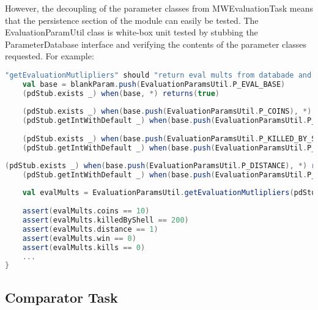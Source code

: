 However, the decoupling of the parameter classes from MWEvaluationTask means that the persistence section of the module can easily be tested. The EvaluationParamUtil class is white-box unit tested by stubbing the ParameterDatabase interface and verifying the contents of the parameter classes requested. For example:

\begin{minipage}{0.9\linewidth}
\centering
\begin{lstlisting}[language=scala]
"getEvaluationMutlipliers" should "return eval mults from databade and zero otherwise" in {
    val base = blankParam.push(EvaluationParamsUtil.P_EVAL_BASE)
    (pdStub.exists _) when(base, *) returns(true)
  
    (pdStub.exists _) when(base.push(EvaluationParamsUtil.P_COINS), *) returns(true)
    (pdStub.getIntWithDefault _) when(base.push(EvaluationParamsUtil.P_COINS), *, *) returns(10)
     
    (pdStub.exists _) when(base.push(EvaluationParamsUtil.P_KILLED_BY_SHELL), *) returns(true)
    (pdStub.getIntWithDefault _) when(base.push(EvaluationParamsUtil.P_KILLED_BY_SHELL), *, *) returns(200)
\end{lstlisting}
\end{minipage}     
    
\begin{minipage}{0.9\linewidth}
\centering
\begin{lstlisting}[language=scala]       
    (pdStub.exists _) when(base.push(EvaluationParamsUtil.P_DISTANCE), *) returns(true)
    (pdStub.getIntWithDefault _) when(base.push(EvaluationParamsUtil.P_DISTANCE), *, *) returns(1)
    
    val evalMults = EvaluationParamsUtil.getEvaluationMutlipliers(pdStub, base);
    
    assert(evalMults.coins == 10)
    assert(evalMults.killedByShell == 200)
    assert(evalMults.distance == 1)
    assert(evalMults.win == 0)
    assert(evalMults.kills == 0)
    ...
}

\end{lstlisting}
\end{minipage}



\subsection{Comparator Task}
\label{subsec:comptask}

